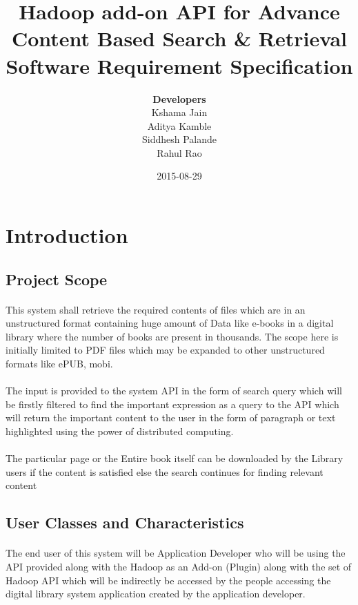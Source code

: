 \documentclass[11pt,letterpaper]{article}
\title{
	\textbf{Hadoop add-on API for Advance Content Based Search \& Retrieval} \\
	Software Requirement Specification
}
\date{
	2015-08-29
}
\author{
	\textbf{Developers}\\
	Kshama Jain \\
	Aditya Kamble \\
	Siddhesh Palande \\
	Rahul Rao
}
\begin{document}
\maketitle
\newpage

\tableofcontents
\newpage


\section{Introduction}


\subsection{Project Scope}

\paragraph{}
This system shall retrieve the required contents of files which are in an unstructured format containing huge amount of Data like e-books in a digital library where the number of books are present in thousands. The scope here is initially limited to PDF files which may be expanded to other unstructured formats like ePUB, mobi.  

\paragraph{}
The input is provided to the system API in the form of search query which will be firstly filtered to find the important expression as a query to the API which will return the important content to the user in the form of paragraph or text highlighted using the power of distributed computing. 

\paragraph{}
The particular page or the Entire book itself can be downloaded by the Library users if the content is satisfied else the search continues for finding relevant content 

\subsection{User Classes and Characteristics}

\paragraph{}
The end user of this system will be Application Developer who will be using the API provided along with the Hadoop as an Add-on (Plugin) along with the set of Hadoop API which will be indirectly be accessed by the people accessing the digital library system application created by the application developer.
\end{document}
